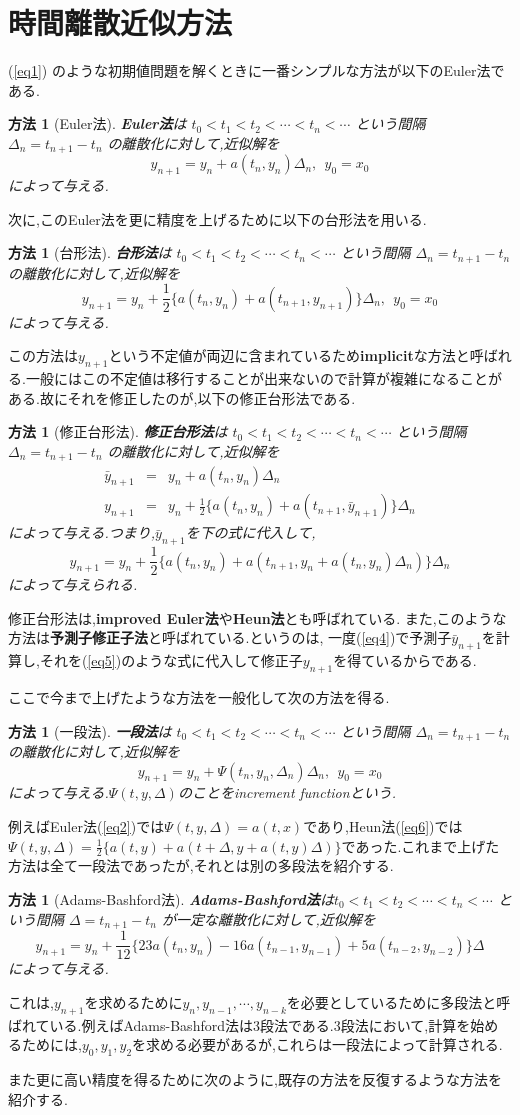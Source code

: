 \documentclass[a4paper]{jreport}
\numberwithin{equation}{section}
\newtheorem{Method}[Thm]{方法}
\renewenvironment{leftbar}{%
  \def\FrameCommand{\vrule width 1pt \hspace{10pt}}%
  \MakeFramed {\advance\hsize-\width \FrameRestore}}%
 {\endMakeFramed}
\def\method{\begin{leftbar}\begin{Method}}
\def\methodx{\end{Method}\end{leftbar}}
\def\eq{\begin{equation}}
\def\eqx{\end{equation}}
\def\eqa{\begin{eqnarray}}
\def\eqax{\end{eqnarray}}
\begin{document}
\section{時間離散近似方法}
(\ref{eq1})
のような初期値問題を解くときに一番シンプルな方法が以下のEuler法である.
\method[Euler法]
{\bf Euler法}は $ t_0 < t_1 < t_2 < \cdots < t_n < \cdots $ という間隔 $\Delta_n = t_{n+1} - t_{n}$ の離散化に対して,近似解を
\eq
\label{eq2}
y_{n+1} = y_n + a(t_n,y_n)\Delta_n,\  \  y_0 = x_0
\eqx
によって与える.
\methodx
次に,このEuler法を更に精度を上げるために以下の台形法を用いる.
\method[台形法]
{\bf 台形法}は $ t_0 < t_1 < t_2 < \cdots < t_n < \cdots $ という間隔 $\Delta_n = t_{n+1} - t_{n}$ の離散化に対して,近似解を
\eq
\label{eq3}
y_{n+1} = y_n + \frac{1}{2} \{ a(t_n,y_n) + a(t_{n+1},y_{n+1}) \} \Delta_n,\  \  y_0 = x_0
\eqx
によって与える.
\methodx
この方法は$y_{n+1}$という不定値が両辺に含まれているため{\bf implicit}な方法と呼ばれる.一般にはこの不定値は移行することが出来ないので計算が複雑になることがある.故にそれを修正したのが,以下の修正台形法である.
\method[修正台形法]
{\bf 修正台形法}は $ t_0 < t_1 < t_2 < \cdots < t_n < \cdots $ という間隔 $\Delta_n = t_{n+1} - t_{n}$ の離散化に対して,近似解を
\eqa
\label{eq4}
\bar{y}_{n+1} &=& y_n + a(t_n,y_n)\Delta_n  \\
\label{eq5}
y_{n+1} &=& y_n + \frac{1}{2} \{ a(t_n,y_n) + a(t_{n+1},\bar{y}_{n+1}) \} \Delta_n 
\eqax
によって与える.つまり,$\bar{y}_{n+1}$を下の式に代入して,
\eq
\label{eq6}
y_{n+1} = y_n + \frac{1}{2} \{ a(t_n,y_n) + a(t_{n+1},y_n + a(t_n,y_n)\Delta_n) \} \Delta_n
\eqx
によって与えられる.
\methodx
修正台形法は,{\bf improved Euler法}や{\bf Heun法}とも呼ばれている.
また,このような方法は{\bf 予測子修正子法}と呼ばれている.というのは,
一度(\ref{eq4})で予測子$\bar{y}_{n+1}$を計算し,それを(\ref{eq5})のような式に代入して修正子$y_{n+1}$を得ているからである.\par
ここで今まで上げたような方法を一般化して次の方法を得る.
\method[一段法]
{\bf 一段法}は $ t_0 < t_1 < t_2 < \cdots < t_n < \cdots $ という間隔 $\Delta_n = t_{n+1} - t_{n}$ の離散化に対して,近似解を
\eq
\label{eq7}
y_{n+1} = y_n + \Psi(t_n,y_n,\Delta_n) \Delta_n,\  \  y_0 = x_0
\eqx
によって与える.$\Psi(t,y,\Delta)$のことをincrement functionという.
\methodx
例えばEuler法(\ref{eq2})では$\Psi(t,y,\Delta) = a(t,x)$であり,Heun法(\ref{eq6})では
$\Psi(t,y,\Delta) = \frac{1}{2} \{ a(t,y) + a(t+\Delta ,y + a(t,y)\Delta) \}$であった.これまで上げた方法は全て一段法であったが,それとは別の多段法を紹介する.
\method[Adams-Bashford法]
{\bf Adams-Bashford法}は$ t_0 < t_1 < t_2 < \cdots < t_n < \cdots $ という間隔 $\Delta = t_{n+1} - t_{n}$ が一定な離散化に対して,近似解を
\eq
\label{eq8}
y_{n+1} = y_n + \frac{1}{12} \{ 23 a(t_n , y_n) - 16 a(t_{n-1},y_{n-1}) + 5 a(t_{n-2},y_{n-2}) \} \Delta
\eqx
によって与える.
\methodx
これは,$y_{n+1}$を求めるために$y_n , y_{n-1} , \cdots , y_{n-k} $を必要としているために多段法と呼ばれている.例えばAdams-Bashford法は3段法である.3段法において,計算を始めるためには,$y_0,y_1,y_2$を求める必要があるが,これらは一段法によって計算される.\par
また更に高い精度を得るために次のように,既存の方法を反復するような方法を紹介する.
\end{document}
